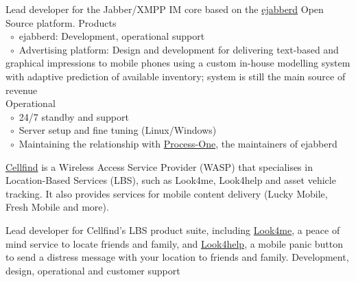 \documentclass[10pt,a4paper,final]{columncv}
\newcommand{\cvitembullet}{~$\circ$~}
\newcommand{\cvitempbullet}{\phantom{\cvitembullet}}
\begin{document}
\begin{cvenv}
         {Lead developer for the Jabber/XMPP IM core based on the 
          \href{http://www.process-one.net/en/ejabberd/}{ejabberd} Open Source platform.}
         {Products \\
          \cvitembullet ejabberd: Development, operational support \\
          \cvitembullet Advertising platform: Design and development for delivering 
          \cvitempbullet text-based and graphical impressions to mobile phones using a 
          \cvitempbullet custom in-house modelling system with adaptive prediction of 
          \cvitempbullet available inventory; system is still the main source of revenue \\
          Operational \\
          \cvitembullet 24/7 standby and support \\
          \cvitembullet Server setup and fine tuning (Linux/Windows) \\
          \cvitembullet Maintaining the relationship with 
                   \href{http://www.process-one.net/en/}{Process-One}, the maintainers of 
          \cvitempbullet ejabberd}
\end{cvenv}

\noindent \href{http://www.cellfind.co.za/}{Cellfind} is a Wireless Access Service Provider (WASP) that specialises in 
Location-Based Services (LBS), such as Look4me, Look4help and asset vehicle tracking. It 
also provides services for mobile content delivery (Lucky Mobile, Fresh Mobile and more). 
\begin{cvenv}
         {Lead developer for Cellfind's LBS product suite, including  
         \href{http://www.look4me.co.za/}{Look4me}, a peace of mind 
         service to locate friends and family, and  
         \href{http://www.look4help.co.za/}{Look4help}, a mobile panic 
         button to send a distress message with your location to friends and family.}
         {Development, design, operational and customer support}
\end{cvenv}

\end{document}
